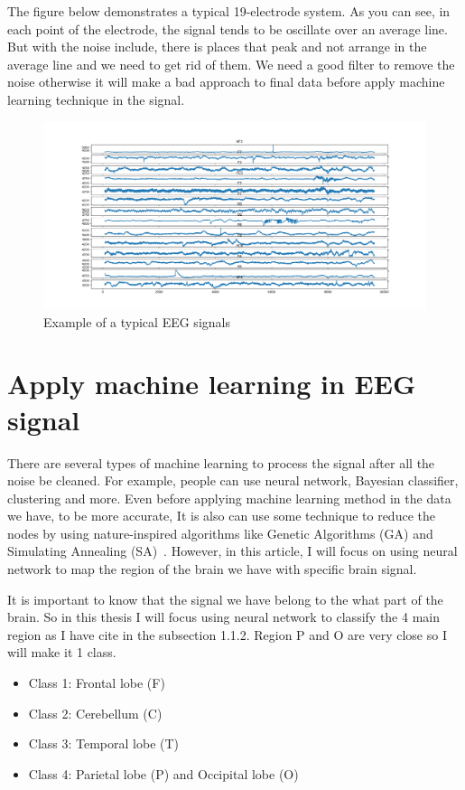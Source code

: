     The figure below demonstrates a typical 19-electrode system. As you can see, in each point of the electrode, the signal tends to be oscillate over an average line. But with the noise include, there is places that peak and not arrange in the average line and we need to get rid of them. We need a good filter to remove the noise otherwise it will make a bad approach to final data before apply machine learning technique in the signal.

    \begin{figure}[h]
        \centering
        \includegraphics[width=1\textwidth]{images/EEGExample.png}
        \caption{Example of a typical EEG signals}
    \end{figure} 
    
\section{Apply machine learning in EEG signal}
    There are several types of machine learning to process the signal after all the noise be cleaned. For example, people can use neural network, Bayesian classifier, clustering and more. Even before applying machine learning method in the data we have, to be more accurate, It is also can use some technique to reduce the nodes by using nature-inspired algorithms like Genetic Algorithms (GA) and Simulating Annealing (SA)~\cite{EEG}. However, in this article, I will focus on using neural network to map the region of the brain we have with specific brain signal.
    
    It is important to know that the signal we have belong to the what part of the brain. So in this thesis I will focus using neural network to classify the 4 main region as I have cite in the subsection 1.1.2. Region P and O are very close so I will make it 1 class.
    
    \begin{itemize}
        \item Class 1: Frontal lobe (F)
        \item Class 2: Cerebellum (C)
        \item Class 3: Temporal lobe (T)
        \item Class 4: Parietal lobe (P) and Occipital lobe (O)
    \end{itemize}    
    
